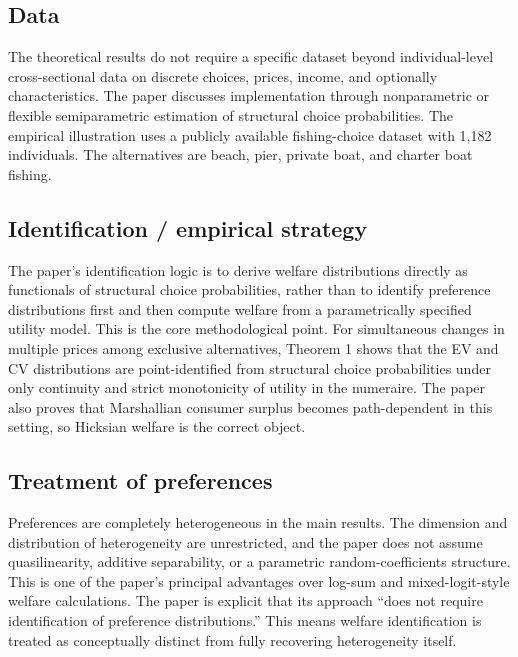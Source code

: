 \documentclass[11pt,a4paper]{article}
\begin{document}
\subsection*{Data}
The theoretical results do not require a specific dataset beyond individual-level cross-sectional data on discrete choices, prices, income, and optionally characteristics. The paper discusses implementation through nonparametric or flexible semiparametric estimation of structural choice probabilities. The empirical illustration uses a publicly available fishing-choice dataset with 1,182 individuals. The alternatives are beach, pier, private boat, and charter boat fishing.

\subsection*{Identification / empirical strategy}
The paper’s identification logic is to derive welfare distributions directly as functionals of structural choice probabilities, rather than to identify preference distributions first and then compute welfare from a parametrically specified utility model. This is the core methodological point. For simultaneous changes in multiple prices among exclusive alternatives, Theorem 1 shows that the EV and CV distributions are point-identified from structural choice probabilities under only continuity and strict monotonicity of utility in the numeraire. The paper also proves that Marshallian consumer surplus becomes path-dependent in this setting, so Hicksian welfare is the correct object.

\subsection*{Treatment of preferences}
Preferences are completely heterogeneous in the main results. The dimension and distribution of heterogeneity are unrestricted, and the paper does not assume quasilinearity, additive separability, or a parametric random-coefficients structure. This is one of the paper’s principal advantages over log-sum and mixed-logit-style welfare calculations. The paper is explicit that its approach “does not require identification of preference distributions.” This means welfare identification is treated as conceptually distinct from fully recovering heterogeneity itself.
\end{document}
